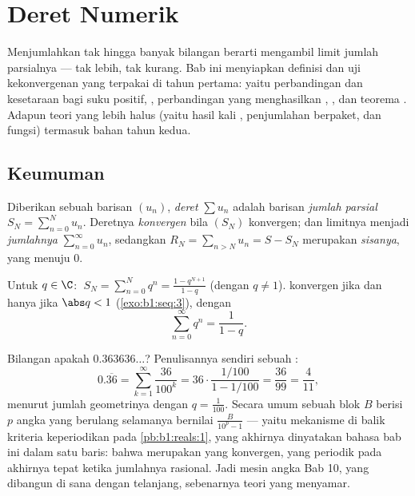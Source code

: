 \chapter{Deret Numerik}\label{ch:b1:series}

Menjumlahkan tak hingga banyak bilangan berarti mengambil limit jumlah
parsialnya --- tak lebih, tak kurang. Bab ini menyiapkan
definisi dan uji kekonvergenan yang terpakai di tahun pertama:
yaitu perbandingan dan kesetaraan bagi suku positif, ,
perbandingan  yang menghasilkan , ,
dan teorema . Adapun teori yang lebih halus (yaitu hasil kali
, penjumlahan berpaket, dan  fungsi) termasuk bahan tahun
kedua.

\section{Keumuman}

\begin{definition}\label{def:b1:series:def}
Diberikan sebuah barisan $(u_n)$, \emph{deret} $\sum u_n$
adalah barisan \emph{jumlah parsial} $S_N = \sum_{n=0}^{N} u_n$.
Deretnya \emph{konvergen} bila $(S_N)$ konvergen; dan limitnya menjadi
\emph{jumlahnya} $\sum_{n=0}^{\infty} u_n$, sedangkan $R_N = \sum_{n > N} u_n =
S - S_N$ merupakan \emph{sisanya}, yang menuju $0$.
\end{definition}

\begin{example}\label{ex:b1:series:geometric}
Untuk $q \in \C$: $\;S_N = \sum_{n=0}^{N} q^n = \frac{1 -
q^{N+1}}{1-q}$ (dengan $q \neq 1$).  konvergen jika dan hanya jika $\abs q < 1$
(\cref{exo:b1:seq:3}), dengan
\[
\sum_{n=0}^{\infty} q^n = \frac{1}{1 - q} .
\]
\end{example}

\begin{example}\label{ex:b1:series:periodicdecimal}
Bilangan apakah $0.363636\dots$? Penulisannya sendiri sebuah :
\[
0.\overline{36} = \sum_{k=1}^{\infty} \frac{36}{100^k}
= 36\cdot\frac{1/100}{1 - 1/100} = \frac{36}{99} =
\frac{4}{11} ,
\]
menurut jumlah geometrinya dengan $q = \frac{1}{100}$. Secara umum sebuah
blok $B$ berisi $p$ angka yang berulang selamanya bernilai
$\frac{B}{10^p - 1}$ --- yaitu mekanisme di balik kriteria keperiodikan
pada \cref{pb:b1:reals:1}, yang akhirnya dinyatakan bahasa bab ini
dalam satu baris: bahwa  merupakan  yang konvergen,
yang periodik pada akhirnya tepat ketika jumlahnya rasional.
Jadi mesin angka Bab 10, yang dibangun di sana dengan 
telanjang, sebenarnya teori  yang menyamar.
\end{example}

